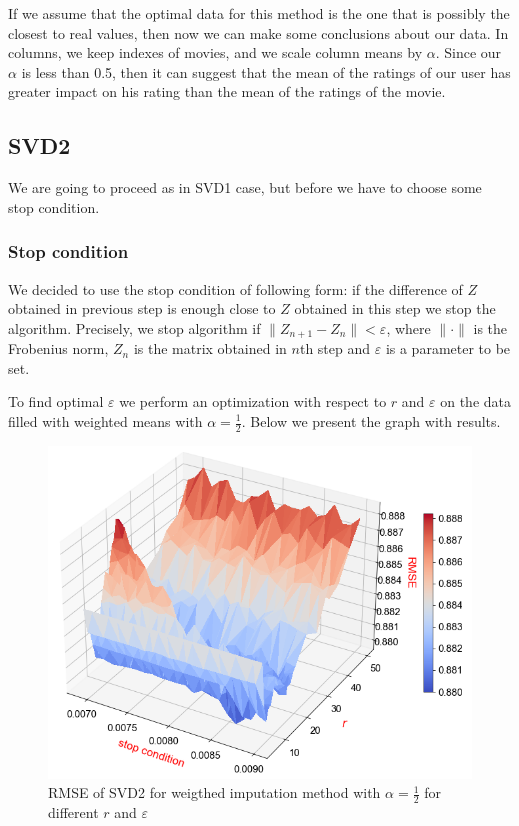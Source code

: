 \documentclass[10pt]{amsart}
\begin{document}
If we assume that the optimal data for this method is the one that is possibly the closest to real values, then now we can make some conclusions about our data.
In columns, we keep indexes of movies, and we scale column means by $\alpha$.
Since our $\alpha$ is less than 0.5, then it can suggest that the mean of the ratings of our user has greater impact on his rating than the mean of the ratings of the movie.







\subsection*{SVD2}
We are going to proceed as in SVD1 case, but before we have to choose some stop condition.

\subsubsection*{Stop condition}
We decided to use the stop condition of following form: if the difference of $Z$ obtained in previous step is enough close to $Z$ obtained in this step we stop the algorithm.
Precisely, we stop algorithm if $\|Z_{n+1} - Z_n\| < \varepsilon$, where $\|\cdot\|$ is the Frobenius norm, $Z_n$ is the matrix obtained in $n$th step and $\varepsilon$ is a parameter to be set.

To find optimal $\varepsilon$ we perform an optimization with respect to $r$ and $\varepsilon$
on the data filled with weighted means with $\alpha = \frac{1}{2}$.
Below we present the graph with results.

\begin{figure}[H]
    \includegraphics[scale=0.54]{svd2_stop2}
    \caption{RMSE of SVD2 for weigthed imputation method with $\alpha = \frac{1}{2}$ for different $r$ and $\varepsilon$}
\end{figure}
\end{document}
